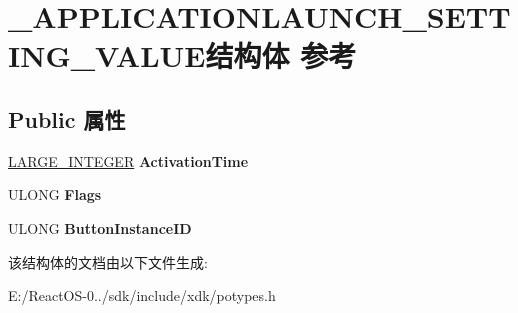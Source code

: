 \hypertarget{struct___a_p_p_l_i_c_a_t_i_o_n_l_a_u_n_c_h___s_e_t_t_i_n_g___v_a_l_u_e}{}\section{\+\_\+\+A\+P\+P\+L\+I\+C\+A\+T\+I\+O\+N\+L\+A\+U\+N\+C\+H\+\_\+\+S\+E\+T\+T\+I\+N\+G\+\_\+\+V\+A\+L\+U\+E结构体 参考}
\label{struct___a_p_p_l_i_c_a_t_i_o_n_l_a_u_n_c_h___s_e_t_t_i_n_g___v_a_l_u_e}
\subsection*{Public 属性}
\begin{DoxyCompactItemize}
\item 
\mbox{\label{struct___a_p_p_l_i_c_a_t_i_o_n_l_a_u_n_c_h___s_e_t_t_i_n_g___v_a_l_u_e_a84ae3b154bf7edb7abe4006f23fb9bb7}} 
\hyperlink{union___l_a_r_g_e___i_n_t_e_g_e_r}{L\+A\+R\+G\+E\+\_\+\+I\+N\+T\+E\+G\+ER} {\bfseries Activation\+Time}
\item 
\mbox{\label{struct___a_p_p_l_i_c_a_t_i_o_n_l_a_u_n_c_h___s_e_t_t_i_n_g___v_a_l_u_e_ae78af249f43812ff1d61cb6441fc85fb}} 
U\+L\+O\+NG {\bfseries Flags}
\item 
\mbox{\label{struct___a_p_p_l_i_c_a_t_i_o_n_l_a_u_n_c_h___s_e_t_t_i_n_g___v_a_l_u_e_a51adb853105efc4857c807cf9d3c9d32}} 
U\+L\+O\+NG {\bfseries Button\+Instance\+ID}
\end{DoxyCompactItemize}


该结构体的文档由以下文件生成\+:\begin{DoxyCompactItemize}
\item 
E\+:/\+React\+O\+S-\/0../sdk/include/xdk/potypes.\+h\end{DoxyCompactItemize}
